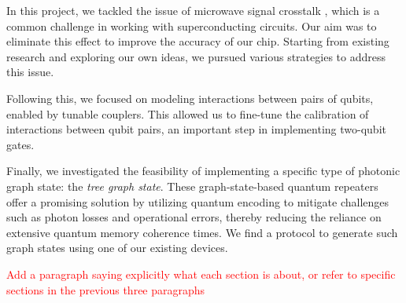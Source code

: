 In this project, we tackled the issue of microwave signal crosstalk \cite{Crosstalk_intro_1, crosstalk_intro_2, signal_crosstalk}, which is a common challenge in working with superconducting circuits.
Our aim was to eliminate this effect to improve the accuracy of our chip.
Starting from existing research \cite{crosstalk} and exploring our own ideas, we pursued various strategies to address this issue.

Following this, we focused on modeling interactions between pairs of qubits, enabled by tunable couplers.
This allowed us to fine-tune the calibration of interactions between qubit pairs, an important step in implementing two-qubit gates.

Finally, we investigated the feasibility of implementing a specific type of photonic graph state: the \emph{tree graph state}.
These graph-state-based quantum repeaters \cite{Why_tree_graph_state} offer a promising solution by utilizing quantum encoding to mitigate challenges such as photon losses and operational errors, thereby reducing the reliance on extensive quantum memory coherence times.
We find a protocol to generate such graph states using one of our existing devices.

\textcolor{red}{Add a paragraph saying explicitly what each section is about, or refer to specific sections in the previous three paragraphs}